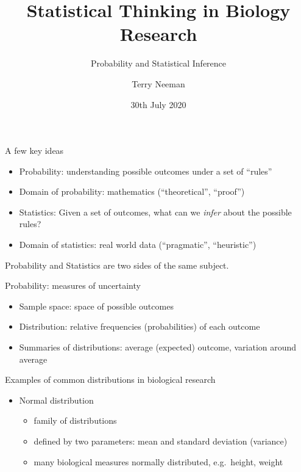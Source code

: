 \documentclass[
  12pt,
  ignorenonframetext,
  aspectratio=169,
]{beamer}
\title{Statistical Thinking in Biology Research}
\subtitle{Probability and Statistical Inference}
\author{Terry Neeman}
\date{30th July 2020}
\institute{Australian National University}
\providecommand{\tightlist}{%
  \setlength{\itemsep}{0pt}\setlength{\parskip}{0pt}}
\begin{document}
\frame{\titlepage}

\begin{frame}{A few key ideas}
\protect\hypertarget{a-few-key-ideas}{}

\begin{itemize}
\tightlist
\item
  Probability: understanding possible outcomes under a set of ``rules''
\item
  Domain of probability: mathematics (``theoretical'', ``proof'')
\item
  Statistics: Given a set of outcomes, what can we \emph{infer} about
  the possible rules?
\item
  Domain of statistics: real world data (``pragmatic'', ``heuristic'')
\end{itemize}

\begin{block}{Probability and Statistics are two sides of the same
subject.}

\end{block}

\end{frame}

\begin{frame}{Probability: measures of uncertainty}
\protect\hypertarget{probability-measures-of-uncertainty}{}

\begin{itemize}
\tightlist
\item
  Sample space: space of possible outcomes
\item
  Distribution: relative frequencies (probabilities) of each outcome
\item
  Summaries of distributions: average (expected) outcome, variation
  around average
\end{itemize}

\end{frame}

\begin{frame}{Examples of common distributions in biological research}
\protect\hypertarget{examples-of-common-distributions-in-biological-research}{}

\begin{itemize}
\tightlist
\item
  Normal distribution

  \begin{itemize}
  \tightlist
  \item
    family of distributions
  \item
    defined by two parameters: mean and standard deviation (variance)
  \item
    many biological measures normally distributed, e.g.~height, weight
  \end{itemize}
\end{itemize}

\end{frame}
\end{document}
